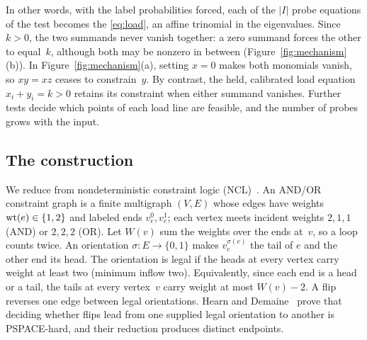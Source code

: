In other words, with the label probabilities forced, each of the $|I|$
probe equations of the test becomes the 
\eqref{eq:load}, an affine trinomial in the eigenvalues. Since $k>0$, the
two summands never vanish together: a zero summand forces the other to
equal~$k$, although both may be nonzero in between
(Figure~\ref{fig:mechanism}(b)). %
In Figure~\ref{fig:mechanism}(a), setting $x=0$ makes both monomials
vanish, so $xy=xz$ ceases to constrain~$y$. By contrast, the held, calibrated load
equation $x_i+y_i=k>0$ retains its constraint when either summand
vanishes. Further tests decide which points of each load line are feasible,
and the number of probes grows with the input.

\subsection{The construction}\label{sec:construction}

We reduce from nondeterministic constraint logic
(NCL)~\cite{hearndemaine}. An AND/OR constraint graph is a finite
multigraph $(V,E)$ whose edges have weights $\operatorname{wt}(e)\in\{1,2\}$ and labeled
ends $v_e^0,v_e^1$; each vertex meets incident weights $2,1,1$ (AND) or
$2,2,2$ (OR). Let $W(v)$ sum the weights over the ends at~$v$, so a loop
counts twice. An orientation $\sigma:E\to\{0,1\}$ makes $v_e^{\sigma(e)}$
the tail of $e$ and the other end its head. The orientation is legal if the heads at
every vertex carry weight at least two (minimum inflow two). Equivalently, since each end is a head or a
tail, the tails at every vertex~$v$ carry weight at most $W(v)-2$. A
flip reverses one edge between legal orientations. Hearn and
Demaine~\cite[Section~2 and Corollary~6]{hearndemaine} prove that deciding
whether flips lead from one supplied legal orientation to another is
PSPACE-hard, and their reduction produces distinct endpoints.

